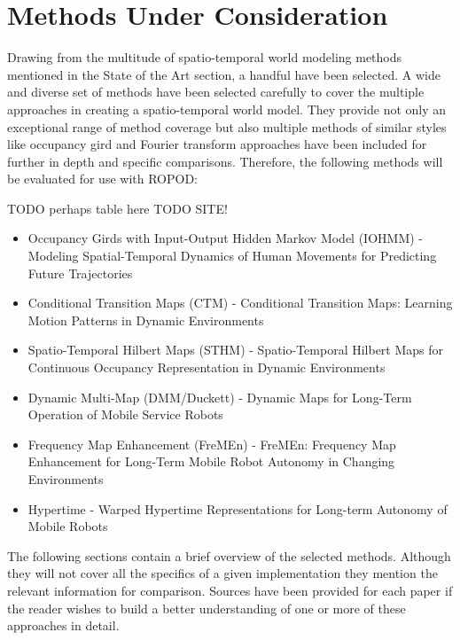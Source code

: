   \section{ Methods Under Consideration }

  Drawing from the multitude of spatio-temporal world modeling methods mentioned
  in the State of the Art section, a handful have been selected. A wide and
  diverse set of methods have been selected carefully to cover the multiple
  approaches in creating a spatio-temporal world model. They provide not only
  an exceptional range of method coverage but also multiple methods of similar
  styles like occupancy gird and Fourier transform approaches have been included
  for further in depth and specific comparisons. Therefore, the following
  methods will be evaluated for use with ROPOD:

  TODO perhaps table here
  TODO SITE!
  \begin{itemize}
    \item Occupancy Girds with Input-Output Hidden Markov Model (IOHMM) - Modeling Spatial-Temporal Dynamics of Human Movements for Predicting Future Trajectories \cite{wang2015}
    \item Conditional Transition Maps (CTM) - Conditional Transition Maps: Learning Motion Patterns in Dynamic Environments \cite{Kucner2013}
    \item Spatio-Temporal Hilbert Maps (STHM) - Spatio-Temporal Hilbert Maps for Continuous Occupancy Representation in Dynamic Environments \cite{Senanayake2016}
    \item Dynamic Multi-Map (DMM/Duckett) - Dynamic Maps for Long-Term Operation of Mobile Service Robots \cite{biber2005}
    \item Frequency Map Enhancement (FreMEn) - FreMEn: Frequency Map Enhancement for Long-Term Mobile Robot Autonomy in Changing Environments \cite{Krajnik2015}
    \item Hypertime - Warped Hypertime Representations for Long-term Autonomy of Mobile Robots \cite{kranjik2018}
  \end{itemize}

  The following sections contain a brief overview of the selected methods.
  Although they will not cover all the specifics of a given implementation they
  mention the relevant information for comparison. Sources have been provided
  for each paper if the reader wishes to build a better understanding of one
  or more of these approaches in detail.

